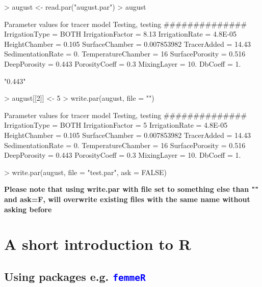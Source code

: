 \documentclass{scrartcl}
\newcommand{\Rcode}[1]{\texttt{\textcolor{blue}{#1}}}
\begin{document}
\begin{Schunk}
\begin{Sinput}
> august <- read.par("august.par")
> august
\end{Sinput}
\begin{Soutput}
Parameter values for tracer model
Testing, testing           
##############
IrrigationType  =  BOTH
IrrigationFactor  =  8.13
IrrigationRate  =  4.8E-05
HeightChamber  =  0.105
SurfaceChamber  =  0.007853982
TracerAdded  =  14.43
SedimentationRate  =  0.
TemperatureChamber  =  16
SurfacePorosity  =  0.516
DeepPorosity  =  0.443
PorosityCoeff  =  0.3		
MixingLayer  =  10.
DbCoeff  =  1.
\end{Soutput}
\begin{Soutput}
[1] "0.443"
\end{Soutput}
\begin{Sinput}
> august[[2]] <- 5
> write.par(august, file = "")
\end{Sinput}
\begin{Soutput}
Parameter values for tracer model
Testing, testing           
##############
IrrigationType  =  BOTH 
IrrigationFactor  =  5 
IrrigationRate  =  4.8E-05 
HeightChamber  =  0.105 
SurfaceChamber  =  0.007853982 
TracerAdded  =  14.43 
SedimentationRate  =  0. 
TemperatureChamber  =  16 
SurfacePorosity  =  0.516 
DeepPorosity  =  0.443 
PorosityCoeff  =  0.3		 
MixingLayer  =  10. 
DbCoeff  =  1. 
\end{Soutput}
\begin{Sinput}
> write.par(august, file = "test.par", ask = FALSE)
\end{Sinput}
\end{Schunk}

\textbf{Please note that using write.par with file set to something
  else than "" and ask=F, will overwrite existing files with the same
  name without asking before}

\newpage 
\appendix
\section{A short introduction to R}
\label{sec:short-introduction-r}


\subsection{Using packages e.g. \Rcode{femmeR}}
\end{document}
